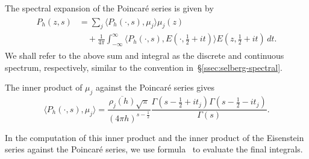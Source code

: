 The spectral expansion of the Poincar\'{e} series is given by
\begin{align}\label{eq:Pspectral}
  \begin{split}
    P_h(z,s)&=\sum_j \langle P_h(\cdot,s),\mu_j \rangle \mu_j(z) \\
            &\quad + \frac{1}{4\pi}\int_{-\infty}^\infty\langle
    P_h(\cdot,s),E(\cdot,\tfrac{1}{2}+it)\rangle E(z,\tfrac{1}{2}+it)\,dt.
  \end{split}
\end{align}
We shall refer to the above sum and integral as the discrete and continuous spectrum,
respectively, similar to the convention in~\S\ref{ssec:selberg-spectral}.


The inner product of $\mu_j$ against the Poincar\'{e} series gives
\begin{equation}\label{eq:mujP}
  \langle P_h(\cdot,s),\mu_j \rangle = \frac{\overline{\rho_j(h)}\sqrt{\pi}}{(4\pi
  h)^{s-\frac{1}{2}}}
  \frac{\Gamma(s-\frac{1}{2}+it_j)\Gamma(s-\frac{1}{2}-it_j)}{\Gamma(s)}.
\end{equation}
\begin{remark}
  In the computation of this inner product and the inner product of the Eisenstein series
  against the Poincar\'e series, we use formula~\cite[$\S$6.621(3)]{GradshteynRyzhik07} to
  evaluate the final integrals.
\end{remark}

%


